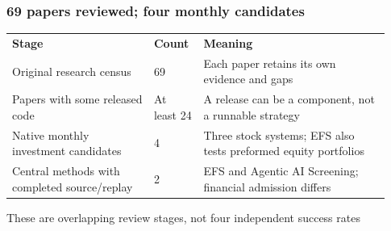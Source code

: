 \documentclass[aspectratio=169,10pt,xcolor=table]{beamer}
\begin{document}
\begin{frame}[t]
\frametitle{69 papers reviewed; four monthly candidates}
\relax
{\fontsize{8.2}{10.2}\selectfont\renewcommand{\arraystretch}{1.23}\setlength{\tabcolsep}{4pt}
\begin{tabular}{>{\raggedright\arraybackslash}p{0.35\linewidth}>{\raggedright\arraybackslash}p{0.12\linewidth}>{\raggedright\arraybackslash}p{0.46\linewidth}}
\rowcolor{Navy} \textcolor{Paper}{\textbf{Stage}} & \textcolor{Paper}{\textbf{Count}} & \textcolor{Paper}{\textbf{Meaning}}\\
\rowcolor{Paper} \textcolor{Ink}{Original research census} & \textcolor{Ink}{69} & \textcolor{Ink}{Each paper retains its own evidence and gaps}\\[2pt]
\rowcolor{Light} \textcolor{Ink}{Papers with some released code} & \textcolor{Ink}{At least 24} & \textcolor{Ink}{A release can be a component, not a runnable strategy}\\[2pt]
\rowcolor{Paper} \textcolor{Ink}{Native monthly investment candidates} & \textcolor{Ink}{4} & \textcolor{Ink}{Three stock systems; EFS also tests preformed equity portfolios}\\[2pt]
\rowcolor{Light} \textcolor{Ink}{Central methods with completed source/replay} & \textcolor{Ink}{2} & \textcolor{Ink}{EFS and Agentic AI Screening; financial admission differs}\\[2pt]
\end{tabular}
}
\par\vspace{.3cm}
{\scriptsize\color{Muted} These are overlapping review stages, not four independent success rates}\par\medskip
{}
\end{frame}
\end{document}
